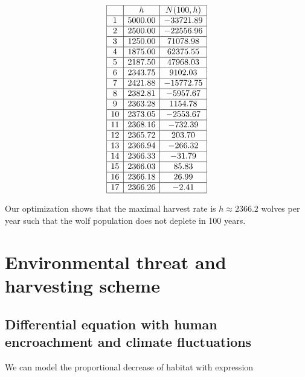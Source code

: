 \documentclass{amsart}
\theoremstyle{definition}
\theoremstyle{remark}
\numberwithin{equation}{section}
\begin{document}
% 
\begin{table}[ht]
\caption{}\label{eqtable}
\renewcommand\arraystretch{1.5}
\noindent\[
\begin{array}{|c|c|c|}
  \hline
 & h & N(100,h) \\ 
  \hline
1 & 5000.00 & -33721.89 \\ \hline
  2 & 2500.00 & -22556.96 \\ \hline
  3 & 1250.00 & 71078.98 \\ \hline
  4 & 1875.00 & 62375.55 \\ \hline
  5 & 2187.50 & 47968.03 \\ \hline
  6 & 2343.75 & 9102.03 \\ \hline
  7 & 2421.88 & -15772.75 \\ \hline
  8 & 2382.81 & -5957.67 \\ \hline
  9 & 2363.28 & 1154.78 \\ \hline
  10 & 2373.05 & -2553.67 \\ \hline
  11 & 2368.16 & -732.39 \\ \hline
  12 & 2365.72 & 203.70 \\ \hline
  13 & 2366.94 & -266.32 \\ \hline
  14 & 2366.33 & -31.79 \\ \hline
  15 & 2366.03 & 85.83 \\ \hline
  16 & 2366.18 & 26.99 \\ \hline
  17 & 2366.26 & -2.41 \\
   \hline
\end{array}
\]
\end{table}

Our optimization shows that the maximal harvest rate is $h\approx2366.2$ wolves per year such that the wolf population does not deplete in 100 years.


\section{Environmental threat and harvesting scheme}
\subsection{Differential equation with human encroachment and climate fluctuations} We can model the proportional decrease of habitat with expression
\end{document}
